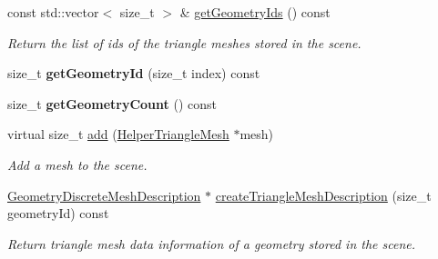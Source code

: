 \begin{DoxyCompactItemize}
\item 
\mbox{\label{classvisilib_1_1_helper_triangle_mesh_container_a63ca99e5f2dcb90f0066ffe38e071879}} 
const std\+::vector$<$ size\+\_\+t $>$ \& \mbox{\hyperlink{classvisilib_1_1_helper_triangle_mesh_container_a63ca99e5f2dcb90f0066ffe38e071879}{get\+Geometry\+Ids}} () const
\begin{DoxyCompactList}\small\item\em Return the list of ids of the triangle meshes stored in the scene. \end{DoxyCompactList}\item 
\mbox{\label{classvisilib_1_1_helper_triangle_mesh_container_accd8d513939ca4f856b6292fbd94344e}} 
size\+\_\+t {\bfseries get\+Geometry\+Id} (size\+\_\+t index) const
\item 
\mbox{\label{classvisilib_1_1_helper_triangle_mesh_container_a08d242a0481429d98a0a23aac8305ea8}} 
size\+\_\+t {\bfseries get\+Geometry\+Count} () const
\item 
\mbox{\label{classvisilib_1_1_helper_triangle_mesh_container_ab29cb0e681a4cc58ad6a31c08ba371e5}} 
virtual size\+\_\+t \mbox{\hyperlink{classvisilib_1_1_helper_triangle_mesh_container_ab29cb0e681a4cc58ad6a31c08ba371e5}{add}} (\mbox{\hyperlink{classvisilib_1_1_helper_triangle_mesh}{Helper\+Triangle\+Mesh}} $\ast$mesh)
\begin{DoxyCompactList}\small\item\em Add a mesh to the scene. \end{DoxyCompactList}\item 
\mbox{\label{classvisilib_1_1_helper_triangle_mesh_container_adef9e75e930431227494fdcd5de664da}} 
\mbox{\hyperlink{structvisilib_1_1_geometry_discrete_mesh_description}{Geometry\+Discrete\+Mesh\+Description}} $\ast$ \mbox{\hyperlink{classvisilib_1_1_helper_triangle_mesh_container_adef9e75e930431227494fdcd5de664da}{create\+Triangle\+Mesh\+Description}} (size\+\_\+t geometry\+Id) const
\begin{DoxyCompactList}\small\item\em Return triangle mesh data information of a geometry stored in the scene. \end{DoxyCompactList}\item 

\end{DoxyCompactItemize}

